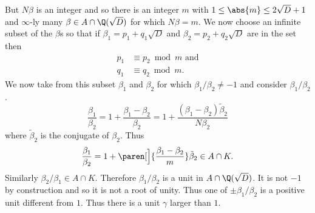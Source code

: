 But $N\beta$ is an integer and so there is an integer $m$ with $1\leq \abs{m}\leq2\sqrt{D}+1$ and $\infty$-ly many $\beta\in A\cap\Q(\sqrt{D})$ for which $N\beta=m$.  We now choose an infinite subset of the $\beta$s so that if $\beta_1=p_1+q_1\sqrt{D}$ and $\beta_2=p_2+q_2\sqrt{D}$ are in the set then
\begin{align*}
p_1 &\equiv p_2 \bmod{m} \text{ and} \\
q_1 &\equiv q_2 \bmod{m} .
\end{align*}
We now take from this subset $\beta_1$ and $\beta_2$ for which $\beta_1/\beta_2\neq-1$ and consider $\beta_1/\beta_2$.
\[ \frac{\beta_1}{\beta_2} = 1 + \frac{\beta_1-\beta_2}{\beta_2} = 1 + \frac{(\beta_1-\beta_2)\tilde\beta_2}{N\beta_2} \]
where $\tilde\beta_2$ is the conjugate of $\beta_2$.  Thus
\[ \frac{\beta_1}{\beta_2} = 1 + \paren[\Big]{\frac{\beta_1-\beta_2}{m}}\tilde\beta_2 \in A \cap K . \]
Similarly $\beta_2/\beta_1\in A\cap K$.  Therefore $\beta_1/\beta_2$ is a unit in $A\cap\Q(\sqrt{D})$.  It is not $-1$ by construction and so it is not a root of unity.  Thus one of $\pm\beta_1/\beta_2$ is a positive unit different from $1$.  Thus there is a unit $\gamma$ larger than $1$.
